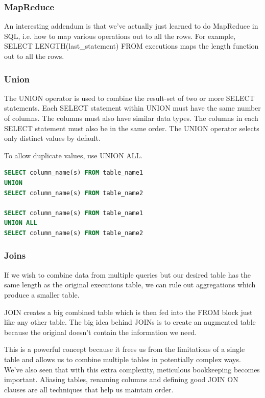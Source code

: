 \documentclass{article}
\begin{document}
\subsubsection{MapReduce}

An interesting addendum is that we've actually just learned to do MapReduce in SQL, i.e. how to map various operations out to all the rows. For example, SELECT LENGTH(last\_statement) FROM executions maps the length function out to all the rows.

\subsubsection{Union}

The UNION operator is used to combine the result-set of two or more SELECT statements. Each SELECT statement within UNION must have the same number of columns. The columns must also have similar data types. The columns in each SELECT statement must also be in the same order. The UNION operator selects only distinct values by default. 

To allow duplicate values, use UNION ALL.

\vspace{8pt} \begin{lstlisting}[language=SQL]
SELECT column_name(s) FROM table_name1
UNION
SELECT column_name(s) FROM table_name2

SELECT column_name(s) FROM table_name1
UNION ALL
SELECT column_name(s) FROM table_name2
\end{lstlisting} \vspace{8pt}

\subsubsection{Joins}

If we wish to combine data from multiple queries but our desired table has the same length as the original executions table, we can rule out aggregations which produce a smaller table.

JOIN creates a big combined table which is then fed into the FROM block just like any other table. The big idea behind JOINs is to create an augmented table because the original doesn't contain the information we need. 

This is a powerful concept because it frees us from the limitations of a single table and allows us to combine multiple tables in potentially complex ways. We’ve also seen that with this extra complexity, meticulous bookkeeping becomes important. Aliasing tables, renaming columns and defining good JOIN ON clauses are all techniques that help us maintain order.
\end{document}
